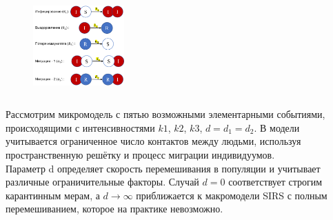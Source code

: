 \documentclass[
    11pt, %
    aspectratio=169, %
]{beamer}
\begin{document}
\begin{frame}
\begin{columns}[t]
        \begin{column}{0.3\textwidth}
            \begin{figure}
                \vspace{-0.1cm}
                \centering
                \includegraphics[angle=0, width=3.5cm]{KineticPrinciple.png}
            \end{figure}
        \end{column}

        \begin{column}{0.02\textwidth}
        \end{column}
	\end{columns}

    \vspace{-0.2cm}

    Рассмотрим микромодель с пятью возможными элементарными событиями, происходящими с интенсивностями $k1$, $k2$, $k3$, $d = d_1 = d_2$. В модели учитывается ограниченное число контактов между людьми, используя пространственную решётку и процесс миграции индивидуумов. \\
    Параметр d определяет скорость перемешивания в популяции и учитывает различные ограничительные факторы. Случай $d=0$ соответствует строгим карантинным мерам, а $d \rightarrow \infty$ приближается к макромодели SIRS с полным перемешиванием, которое на практике невозможно.

\end{frame}
\end{document}
